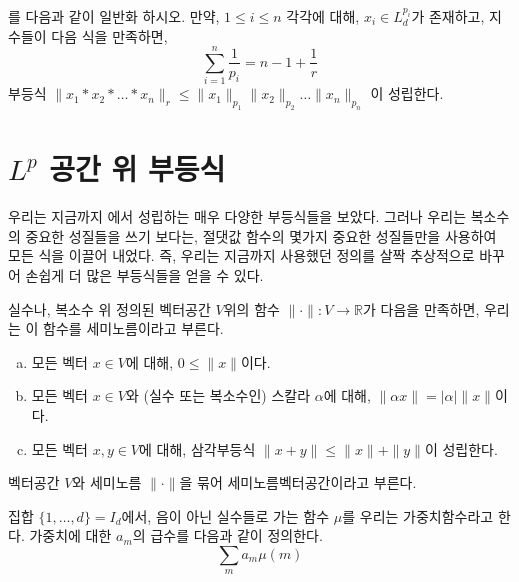\begin{exercise}
    를 다음과 같이 일반화 하시오.
    만약, $1 \leq i \leq n$ 각각에 대해, $x_i \in L^{p_i}_d$가 존재하고, 지수들이 다음 식을 만족하면,
    \begin{equation*}
        \sum_{i = 1}^n \frac{1}{p_i} = n - 1 + \frac{1}{r}
    \end{equation*}
    부등식 $\|x_1 * x_2 * \dots * x_n\|_r \leq \|x_1\|_{p_1}\|x_2\|_{p_2}\dots \|x_n\|_{p_n}$ 이 성립한다.
\end{exercise}

\section{\texorpdfstring{$L^p$}{L\textasciicircum p} 공간 위 부등식}
우리는 지금까지 에서 성립하는 매우 다양한 부등식들을 보았다.
그러나 우리는 복소수의 중요한 성질들을 쓰기 보다는, 절댓값 함수의 몇가지 중요한 성질들만을 사용하여 모든 식을 이끌어 내었다.
즉, 우리는 지금까지 사용했던 정의를 살짝 추상적으로 바꾸어 손쉽게 더 많은 부등식들을 얻을 수 있다.

\begin{definition}
    실수나, 복소수 위 정의된 벡터공간 $V$위의 함수 $\|\cdot\| : V \to \mathbb{R}$가 다음을 만족하면, 우리는 이 함수를 세미노름이라고 부른다.
    \begin{enumerate}[(a)]
        \item 모든 벡터 $x \in V$에 대해, $0 \leq \|x\|$이다.
        \item 모든 벡터 $x \in V$와 (실수 또는 복소수인) 스칼라 $\alpha$에 대해, $\|\alpha x\| = |\alpha| \|x\|$이다.
        \item 모든 벡터 $x, y \in V$에 대해, 삼각부등식 $\|x + y\| \leq \|x\| + \|y\|$이 성립한다.
    \end{enumerate}
    벡터공간 $V$와 세미노름 $\|\cdot\|$을 묶어 세미노름벡터공간이라고 부른다.
\end{definition}

\begin{definition}
    집합 $\{1, \dots, d \} = I_d$에서, 음이 아닌 실수들로 가는 함수 $\mu$를 우리는 가중치함수라고 한다.
    가중치에 대한 $a_m$의 급수를 다음과 같이 정의한다.
    \begin{equation*}
        \sum_m a_m \mu(m)
    \end{equation*}
\end{definition}

